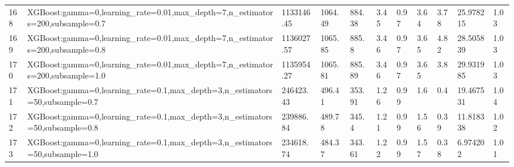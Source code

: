 \begin{longtable}{C{0.8cm} L{2cm} C{1.15cm} C{1.15cm} C{1.15cm} C{1.15cm} C{0.85cm} C{1.25cm} C{1.2cm} C{1.5cm} C{1.0cm}}
168 & XGBoost:\newline gamma=0,\newline learning\_rate=0.01,\newline max\_depth=7,\newline n\_estimators=200,\newline subsample=0.7 & 1133146.45 & 1064.49 & 884.38 & 3.45 & 0.97 & 3.64 & 3.78 & 25.978215 & 1.03 \\
169 & XGBoost:\newline gamma=0,\newline learning\_rate=0.01,\newline max\_depth=7,\newline n\_estimators=200,\newline subsample=0.8 & 1136027.57 & 1065.85 & 885.8 & 3.46 & 0.97 & 3.65 & 4.82 & 28.505839 & 1.03 \\
170 & XGBoost:\newline gamma=0,\newline learning\_rate=0.01,\newline max\_depth=7,\newline n\_estimators=200,\newline subsample=1.0 & 1135954.27 & 1065.81 & 885.89 & 3.46 & 0.97 & 3.65 & 3.8 & 29.931985 & 1.03 \\
171 & XGBoost:\newline gamma=0,\newline learning\_rate=0.1,\newline max\_depth=3,\newline n\_estimators=50,\newline subsample=0.7 & 246423.43 & 496.41 & 353.91 & 1.26 & 0.99 & 1.6 & 0.4 & 19.467531 & 1.04 \\
172 & XGBoost:\newline gamma=0,\newline learning\_rate=0.1,\newline max\_depth=3,\newline n\_estimators=50,\newline subsample=0.8 & 239886.84 & 489.78 & 345.4 & 1.21 & 0.99 & 1.56 & 0.39 & 11.818338 & 1.02 \\
173 & XGBoost:\newline gamma=0,\newline learning\_rate=0.1,\newline max\_depth=3,\newline n\_estimators=50,\newline subsample=1.0 & 234618.74 & 484.37 & 343.61 & 1.22 & 0.99 & 1.57 & 0.38 & 6.974202 & 1.01 \\

\end{longtable}
